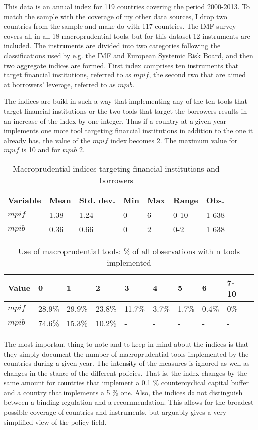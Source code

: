 \documentclass[12pt,a4paper]{article}
\begin{document}
This data is an annual index for 119 countries covering the period 2000-2013. To match the sample with the coverage of my other data sources, I drop two countries from the sample and make do with 117 countries. The IMF survey covers all in all 18 macroprudential tools, but for this dataset 12 instruments are included. The instruments are divided into two categories following the classifications used by e.g. the IMF and European Systemic Risk Board, and then two aggregate indices are formed. First index comprises ten instruments that target financial institutions, referred to as $mpif$, the second two that are aimed at borrowers' leverage, referred to as $mpib$. 

The indices are build in such a way that implementing any of the ten tools that target financial institutions or the two tools that target the borrowers results in an increase of the index by one integer. Thus if a country at a given year implements one more tool targeting financial institutions in addition to the one it already has, the value of the $mpif$ index becomes 2. The maximum value for $mpif$ is 10 and for $mpib$ 2. 

\begin{table}[!h]
\centering
\begin{tabular}{ l l l l l l l }
\hline
Variable&Mean&Std. dev.&Min&Max&Range&Obs. \\
\hline
$mpif$&1.38&1.24&0&6&0-10&1 638 \\
$mpib$&0.36&0.66&0&2&0-2&1 638 \\
\hline
\end{tabular}
\caption{Macroprudential indices targeting financial institutions and borrowers}
\label{tab:mpi}
\end{table}

\begin{table}[!h]
\centering
\begin{tabular}{ l l l l l l l l l l }
\hline
Value&0&1&2&3&4&5&6&7-10\\
\hline
$mpif$&28.9\%&29.9\%&23.8\%&11.7\%&3.7\%&1.7\%&0.4\%&0\% \\
$mpib$&74.6\%&15.3\%&10.2\%&-&-&-&-&- \\
\hline
\end{tabular}
\caption{Use of macroprudential tools: \% of all observations with n tools implemented}
\label{tab:mpiu_use}
\end{table}

The most important thing to note and to keep in mind about the indices is that they simply document the number of macroprudential tools implemented by the countries during a given year. The intensity of the measures is ignored as well as changes in the stance of the different policies. That is, the index changes by the same amount for countries that implement a 0.1 \% countercyclical capital buffer and a country that implements a 5 \% one. Also, the indices do not distinguish between a binding regulation and a recommendation. This allows for the broadest possible coverage of countries and instruments, but arguably gives a very simplified view of the policy field.  
\end{document}
